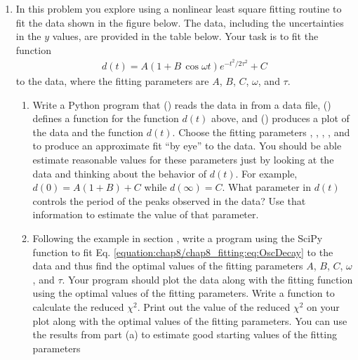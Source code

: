 \documentclass[letterpaper,10pt,english]{sphinxmanual}
\begin{document}
\begin{enumerate}
\begin{enumerate}
\end{enumerate}

\item {} 
\sphinxAtStartPar
In this problem you explore using a non\sphinxhyphen{}linear least square fitting routine to fit the data shown in the figure below.   The data, including the uncertainties in the \(y\) values, are provided in the table below.  Your task is to fit the function
\begin{equation}\label{equation:chap8/chap8_fitting:eq:OscDecay}
\begin{split}d(t) = A (1+B\,\cos\omega t) e^{-t^2/2\tau^2} + C\end{split}
\end{equation}
\sphinxAtStartPar
to the data, where the fitting parameters are \(A\), \(B\), \(C\), \(\omega\), and \(\tau\).

\begin{figure}[htbp]
\centering

\noindent{}
\end{figure}
\begin{enumerate}
%
\item {} 
\sphinxAtStartPar
Write a Python program that () reads the data in from a data file, () defines a function  for the function \(d(t)\) above, and () produces a plot of the data and the function \(d(t)\).  Choose the fitting parameters  , , , , and  to produce an approximate fit “by eye” to the data.  You should be able estimate reasonable values for these parameters just by looking at the data and thinking about the behavior of \(d(t)\).  For example, \(d(0)=A(1+B)+C\) while \(d(\infty)=C\).  What parameter in \(d(t)\) controls the period of the peaks observed in the data?  Use that information to estimate the value of that parameter.

\item {} 
\sphinxAtStartPar
Following the example in section {\hyperref[\detokenize{chap8/chap8_fitting:sec-nonlinfit}]{}}, write a program using the SciPy function  to fit Eq. \eqref{equation:chap8/chap8_fitting:eq:OscDecay} to the data and thus find the optimal values of the fitting parameters \(A\), \(B\), \(C\), \(\omega\), and \(\tau\).  Your program should plot the data along with the fitting function using the optimal values of the fitting parameters.  Write a function to calculate the reduced \(\chi^2\).  Print out the value of the reduced \(\chi^2\) on your plot along with the optimal values of the fitting parameters.  You can use the results from part (a) to estimate good starting values of the fitting parameters


\end{enumerate}
\end{enumerate}
\end{document}

